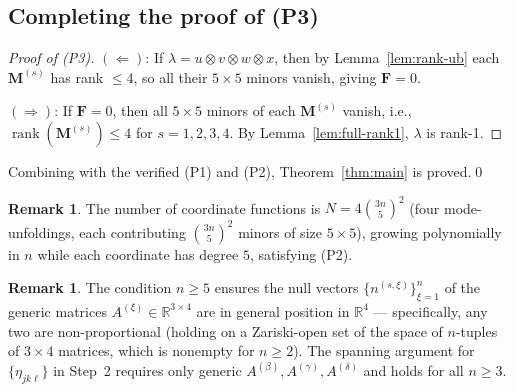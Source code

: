 \documentclass[12pt]{article}
\theoremstyle{definition}
\newtheorem{remark}[theorem]{Remark}
\DeclareMathOperator{\rank}{rank}
\newcommand{\bR}{\mathbb{R}}
\begin{document}
\subsection{Completing the proof of (P3)}

\begin{proof}[Proof of (P3)]
$(\Leftarrow)$: If $\lambda=u\otimes v\otimes w\otimes x$, then by Lemma~\ref{lem:rank-ub}
each $\mathbf{M}^{(s)}$ has rank $\leq4$, so all their $5\times5$ minors vanish, giving
$\mathbf{F}=0$.

$(\Rightarrow)$: If $\mathbf{F}=0$, then all $5\times5$ minors of each $\mathbf{M}^{(s)}$
vanish, i.e., $\rank(\mathbf{M}^{(s)})\leq4$ for $s=1,2,3,4$.  By Lemma~\ref{lem:full-rank1},
$\lambda$ is rank-1.
\end{proof}

Combining with the verified (P1) and (P2), Theorem~\ref{thm:main} is proved.\qed

\begin{remark}
The number of coordinate functions is $N = 4\binom{3n}{5}^2$
(four mode-unfoldings, each contributing $\binom{3n}{5}^2$ minors of size $5\times5$),
growing polynomially in $n$ while each coordinate has degree $5$, satisfying (P2).
\end{remark}

\begin{remark}
The condition $n\geq5$ ensures the null vectors $\{n^{(s,\xi)}\}_{\xi=1}^n$ of the generic
matrices $A^{(\xi)}\in\bR^{3\times4}$ are in general position in $\bR^4$ — specifically,
any two are non-proportional (holding on a Zariski-open set of the space of $n$-tuples of
$3\times4$ matrices, which is nonempty for $n\geq2$).  The spanning argument for
$\{\eta_{jk\ell}\}$ in Step~2 requires only generic $A^{(\beta)},A^{(\gamma)},A^{(\delta)}$
and holds for all $n\geq3$.
\end{remark}
\end{document}

